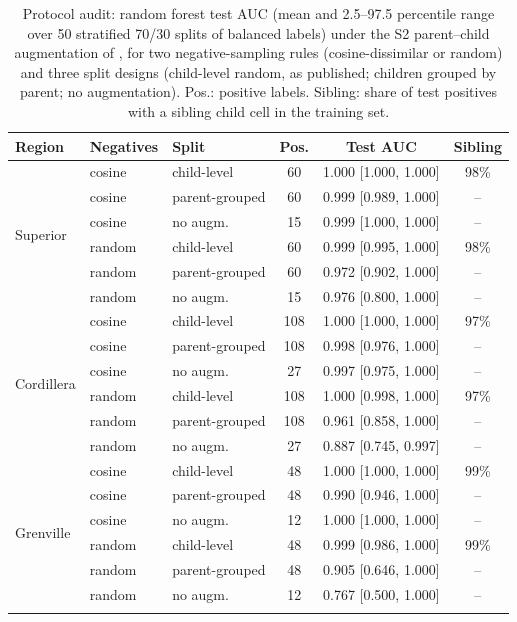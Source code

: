 \documentclass[pdflatex,sn-apa]{sn-jnl}
\begin{document}
\begin{table}[t]
\caption{Protocol audit: random forest test AUC (mean and 2.5--97.5 percentile range over 50 stratified 70/30 splits of balanced labels) under the S2 parent--child augmentation of \citet{Parsa2024}, for two negative-sampling rules (cosine-dissimilar or random) and three split designs (child-level random, as published; children grouped by parent; no augmentation). Pos.: positive labels. Sibling: share of test positives with a sibling child cell in the training set.}\label{tab:audit}
\scriptsize
\setlength{\tabcolsep}{2.5pt}
\begin{tabular*}{\textwidth}{@{\extracolsep\fill}lllccc}
\toprule
Region & Negatives & Split & Pos. & Test AUC & Sibling \\
\midrule
\multirow{6}{*}{Superior} & cosine & child-level & 60 & 1.000 [1.000, 1.000] & 98\% \\
 & cosine & parent-grouped & 60 & 0.999 [0.989, 1.000] & -- \\
 & cosine & no augm. & 15 & 0.999 [1.000, 1.000] & -- \\
 & random & child-level & 60 & 0.999 [0.995, 1.000] & 98\% \\
 & random & parent-grouped & 60 & 0.972 [0.902, 1.000] & -- \\
 & random & no augm. & 15 & 0.976 [0.800, 1.000] & -- \\
\midrule
\multirow{6}{*}{Cordillera} & cosine & child-level & 108 & 1.000 [1.000, 1.000] & 97\% \\
 & cosine & parent-grouped & 108 & 0.998 [0.976, 1.000] & -- \\
 & cosine & no augm. & 27 & 0.997 [0.975, 1.000] & -- \\
 & random & child-level & 108 & 1.000 [0.998, 1.000] & 97\% \\
 & random & parent-grouped & 108 & 0.961 [0.858, 1.000] & -- \\
 & random & no augm. & 27 & 0.887 [0.745, 0.997] & -- \\
\midrule
\multirow{6}{*}{Grenville} & cosine & child-level & 48 & 1.000 [1.000, 1.000] & 99\% \\
 & cosine & parent-grouped & 48 & 0.990 [0.946, 1.000] & -- \\
 & cosine & no augm. & 12 & 1.000 [1.000, 1.000] & -- \\
 & random & child-level & 48 & 0.999 [0.986, 1.000] & 99\% \\
 & random & parent-grouped & 48 & 0.905 [0.646, 1.000] & -- \\
 & random & no augm. & 12 & 0.767 [0.500, 1.000] & -- \\
\botrule
\end{tabular*}
\end{table}
\end{document}
